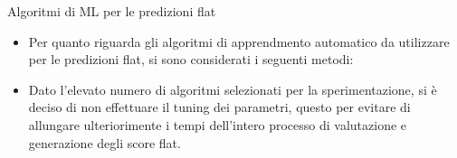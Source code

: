 \documentclass[9pt]{beamer}
\begin{document}
\begin{tframe}{Algoritmi di ML per le predizioni flat}
\begin{itemize}
\item Per quanto riguarda gli algoritmi di apprendmento automatico da utilizzare per le predizioni flat, si sono considerati i seguenti metodi:
\item Dato l'elevato numero di algoritmi selezionati per la sperimentazione, si è deciso di non effettuare il tuning dei parametri, questo per evitare di allungare ulteriorimente i tempi dell'intero processo di valutazione e generazione degli score flat.
\end{itemize}
\end{tframe}
\end{document}
